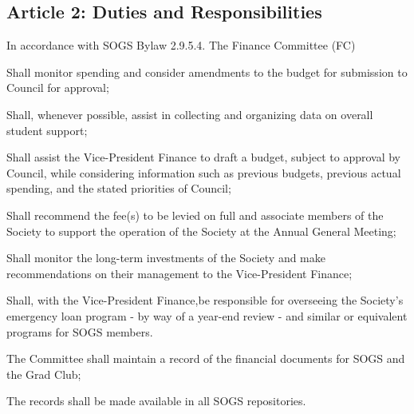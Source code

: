 \subsection{Article 2: Duties and Responsibilities}
\begin{longenum}[ label*=\thesubsection.\arabic*., align=left] 
\item In accordance with SOGS Bylaw 2.9.5.4. The Finance Committee (FC) 
	\begin{longenum}[ label*=\arabic*., align=left]
	\item Shall monitor spending and consider amendments to the budget for submission to Council for approval;
	\item Shall, whenever possible, assist in collecting and organizing data on overall student support;
	\item Shall assist the Vice-President Finance to draft a budget, subject to approval by Council, while considering information such as previous budgets, previous actual spending, and the stated priorities of Council;
	\item Shall recommend the fee(s) to be levied on full and associate members of the Society to support the operation of the Society at the Annual General Meeting;
	\item Shall monitor the long-term investments of the Society and make recommendations on their management to the Vice-President Finance;
	\item Shall, with the Vice-President Finance,be responsible for overseeing the Society's emergency loan program - by way of a year-end review - and similar or equivalent programs for SOGS members. 
	\end{longenum}
\item The Committee shall maintain a record of the financial documents for SOGS and the Grad Club;
	\begin{longenum}[ label*=\arabic*., align=left]
	\item The records shall be made available in all SOGS repositories.
	\end{longenum}
\end{longenum}

